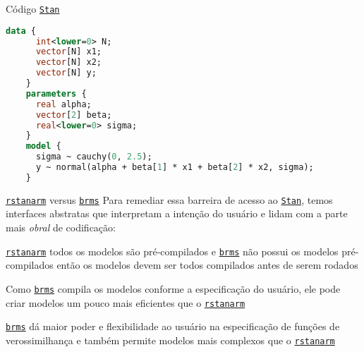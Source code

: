 \begin{frame}[fragile]{Código \href{https://mc-stan.org}{\texttt{Stan}}}
    \begin{lstlisting}[basicstyle=\small, language=Stan]
    data {
      int<lower=0> N;
      vector[N] x1;
      vector[N] x2;
      vector[N] y;
    }
    parameters {
      real alpha;
      vector[2] beta;
      real<lower=0> sigma;
    }
    model {
      sigma ~ cauchy(0, 2.5);
      y ~ normal(alpha + beta[1] * x1 + beta[2] * x2, sigma);
    }
    \end{lstlisting}
\end{frame}

\begin{frame}{\href{http://mc-stan.org/rstanarm/}{\texttt{rstanarm}} versus \href{https://paul-buerkner.github.io/brms/}{\texttt{brms}}}
    Para remediar essa barreira de acesso ao \href{https://mc-stan.org}{\texttt{Stan}},
    temos interfaces abstratas que interpretam a intenção do usuário e
    lidam com a parte mais \textit{obral} de codificação:
    \begin{vfilleditems}
        \small
        \item \href{http://mc-stan.org/rstanarm/}{\texttt{rstanarm}} todos os
        modelos são pré-compilados e
        \href{https://paul-buerkner.github.io/brms/}{\texttt{brms}} não possui os
        modelos pré-compilados então os modelos devem ser todos compilados antes de serem rodados
        \item Como \href{https://paul-buerkner.github.io/brms/}{\texttt{brms}}
        compila os modelos conforme a especificação do usuário, ele pode criar
        modelos um pouco mais eficientes que o \href{http://mc-stan.org/rstanarm/}{\texttt{rstanarm}}
        \item \href{https://paul-buerkner.github.io/brms/}{\texttt{brms}} dá maior poder e flexibilidade
        ao usuário na especificação de funções de verossimilhança e também permite modelos mais complexos
        que o \href{http://mc-stan.org/rstanarm/}{\texttt{rstanarm}}
    \end{vfilleditems}
\end{frame}

